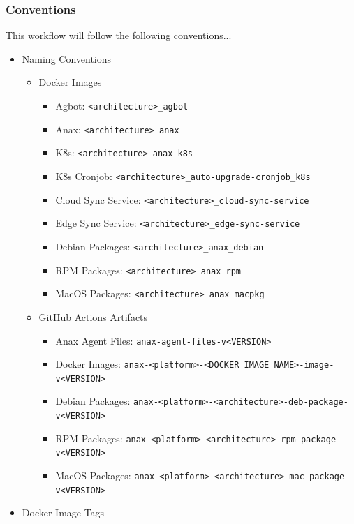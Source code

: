 \documentclass[a4paper,11pt]{article}
\begin{document}
\subsubsection{Conventions}
This workflow will follow the following conventions...
\begin{itemize}
    \item Naming Conventions
    \begin{itemize}
        \item Docker Images
        \begin{itemize}
            \item Agbot: \verb|<architecture>_agbot|
            \item Anax: \verb|<architecture>_anax|
            \item K8s: \verb|<architecture>_anax_k8s|
            \item K8s Cronjob: \verb|<architecture>_auto-upgrade-cronjob_k8s|
            \item Cloud Sync Service: \verb|<architecture>_cloud-sync-service|
            \item Edge Sync Service: \verb|<architecture>_edge-sync-service|
            \item Debian Packages: \verb|<architecture>_anax_debian|
            \item RPM Packages: \verb|<architecture>_anax_rpm|
            \item MacOS Packages: \verb|<architecture>_anax_macpkg|
        \end{itemize}
        \item GitHub Actions Artifacts
        \begin{itemize}
            \item Anax Agent Files: \verb|anax-agent-files-v<VERSION>|
            \item Docker Images: \verb|anax-<platform>-<DOCKER IMAGE NAME>-image-v<VERSION>|
            \item Debian Packages: \verb|anax-<platform>-<architecture>-deb-package-v<VERSION>|
            \item RPM Packages: \verb|anax-<platform>-<architecture>-rpm-package-v<VERSION>|
            \item MacOS Packages: \verb|anax-<platform>-<architecture>-mac-package-v<VERSION>|
        \end{itemize}
    \end{itemize}
    \item{Docker Image Tags}
    \begin{itemize}

\end{itemize}
\end{itemize}
\end{document}
